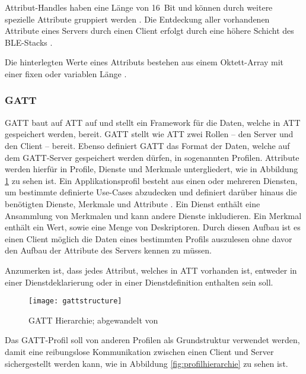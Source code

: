 Attribut-Handles haben eine Länge von 16~Bit und können durch weitere spezielle Attribute gruppiert werden \cite[S.~1412f.]{bluetoothCore}. Die Entdeckung aller vorhandenen Attribute eines Servers durch einen Client erfolgt durch eine höhere Schicht des \ac{BLE}-Stacks \cite[S.~1410]{bluetoothCore}.

Die hinterlegten Werte eines Attributs bestehen aus einem Oktett-Array mit einer fixen oder variablen Länge \cite[S.~1413]{bluetoothCore}.

\subsubsection{\acf{GATT}}
\ac{GATT} baut auf \ac{ATT} auf und stellt ein Framework für die Daten, welche in \ac{ATT} gespeichert werden, bereit. \ac{GATT} stellt wie \ac{ATT} zwei Rollen -- den Server und den Client -- bereit. Ebenso definiert \ac{GATT} das Format der Daten, welche auf dem \ac{GATT}-Server gespeichert werden dürfen, in sogenannten Profilen. Attribute werden hierfür in Profile, Dienste und Merkmale untergliedert, wie in Abbildung \ref{fig:gattstructure} zu sehen ist. Ein Applikationsprofil besteht aus einen oder mehreren Diensten, um bestimmte definierte Use-Cases abzudecken und definiert darüber hinaus die benötigten Dienste, Merkmale und Attribute \cite[S.~207]{bluetoothCore}. Ein Dienst enthält eine Ansammlung von Merkmalen und kann andere Dienste inkludieren. Ein Merkmal enthält ein Wert, sowie eine Menge von Deskriptoren. Durch diesen Aufbau ist es einen Client möglich die Daten eines bestimmten Profils auszulesen ohne davor den Aufbau der Attribute des Servers kennen zu müssen. \cite[S.~280, S.~1480]{bluetoothCore}

Anzumerken ist, dass jedes Attribut, welches in \ac{ATT} vorhanden ist, entweder in einer Dienstdeklarierung oder in einer Dienstdefinition enthalten sein soll. \cite[S.~1483]{bluetoothCore}

\begin{figure}[h]
    \centering
    \texttt{[image: gattstructure]}
    \caption{\acs{GATT} Hierarchie; abgewandelt von \cite[S.~281]{bluetoothCore}}
    \label{fig:gattstructure}
\end{figure}

Das \ac{GATT}-Profil soll von anderen Profilen als Grundstruktur verwendet werden, damit eine reibungslose Kommunikation zwischen einen Client und Server sichergestellt werden kann, wie in Abbildung \ref{fig:profilhierarchie} zu sehen ist. \cite[S.~1470]{bluetoothCore}

